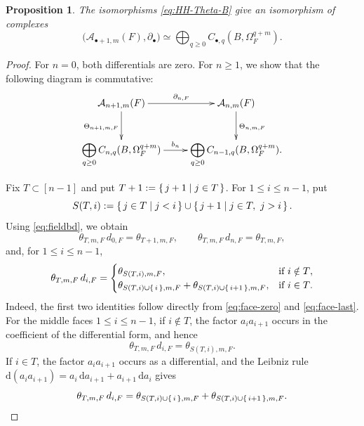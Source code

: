 \documentclass[a4paper,12pt,reqno]{amsart}
\numberwithin{equation}{section}
\newtheorem{prop}[prop]{Proposition}
\theoremstyle{definition}
\renewcommand{\d}{\mathrm{d}}
\newcommand{\blue}{\color{blue}}
\newcommand{\black}{\color{black}}
\newcommand{\Acal}{\mathcal{A}}
\begin{document}
\begin{prop}\label{prop:HHcomplex}
The isomorphisms \eqref{eq:HH-Theta-B} give an isomorphism of complexes
\begin{equation}\label{eq:HH-complex-iso}
 \bigl(\Acal_{\bullet+1,m}(F),\partial_\bullet\bigr)
 \simeq
 \bigoplus_{q\geq0}
 C_{\bullet,q}(B,\Omega_F^{q+m}).
\end{equation}
\end{prop}
\begin{proof}
For $n=0$, both differentials are zero.
For $n\geq1$, we show that the following diagram
is commutative:
\[
\xymatrix{
 \Acal_{n+1,m}(F)
 \ar[r]^-{\partial_{n,F}}
 \ar[d]_{\Theta_{n+1,m,F}}
 &
 \Acal_{n,m}(F)
 \ar[d]^{\Theta_{n,m,F}}
 \\
 \displaystyle\bigoplus_{q\geq0}
 C_{n,q}(B,\Omega_F^{q+m})
 \ar[r]^-{b_n}
 &
 \displaystyle\bigoplus_{q\geq0}
 C_{n-1,q}(B,\Omega_F^{q+m}).
}
\]


Fix $T\subset[n-1]$ and put
$T+1:=\set{j+1\mid j\in T}$.
For $1\leq i\leq n-1$, put
\[
S(T,i) := \set{j\in T\mid j<i}
 \cup
 \set{j+1\mid j\in T,\ j>i}.
\]
Using \eqref{eq:fieldbd}, we obtain 
\begin{equation}\label{eq:HH-face-comp}
 \theta_{T,m,F}\,d_{0,F}
 =
 \theta_{T+1,m,F},
 \qquad
 \theta_{T,m,F}\,d_{n,F}
 =
 \theta_{T,m,F},
\end{equation}
and, for $1\leq i\leq n-1$,
\begin{equation}\label{eq:HH-face-comp-middle}
 \theta_{T,m,F}\,d_{i,F}
 =
 \begin{cases}
\theta_{S(T,i),m,F},&\mbox{if $i\notin T$},\\
  \theta_{S(T,i)\cup\set{i},m,F}
  +
  \theta_{S(T,i)\cup\set{i+1},m,F},
  &\mbox{if $i\in T$}.
 \end{cases}
\end{equation}
Indeed, the first two identities follow directly from
\eqref{eq:face-zero} and \eqref{eq:face-last}.  For the middle faces $1\le i\le n-1$, 
if $i\notin T$, the factor $a_i a_{i+1}$ occurs in the coefficient of
the differential form, and hence
\[
 \theta_{T,m,F}\,d_{i,F}
 =
 \theta_{S(T,i),m,F}.
\]
If $i\in T$, the factor $a_i a_{i+1}$ occurs as a differential, and
the Leibniz rule
$\d(a_i a_{i+1})=a_i\,\d a_{i+1}+a_{i+1}\,\d a_i$ 
gives
\[
 \theta_{T,m,F}\,d_{i,F}
 =
 \theta_{S(T,i)\cup\set{i},m,F}
 +
 \theta_{S(T,i)\cup\set{i+1},m,F}.
\]


\end{proof}
\end{document}
